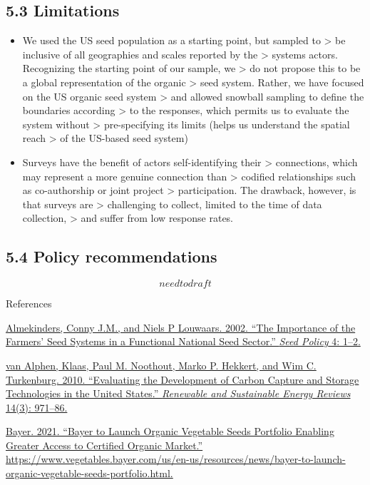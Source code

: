 \documentclass[twoside,12pt,final]{ucthesis-CA2012}
\begin{document}
\begin{ucmainmatter}
{\subsection{5.3 Limitations}\label{limitations}}
\begin{itemize}
\item
  We used the US seed population as a starting point, but sampled to
  \textgreater{} be inclusive of all geographies and scales reported by the
  \textgreater{} system\textquotesingle s actors. Recognizing the starting point of our sample, we
  \textgreater{} do not propose this to be a global representation of the organic
  \textgreater{} seed system. Rather, we have focused on the US organic seed system
  \textgreater{} and allowed snowball sampling to define the boundaries according
  \textgreater{} to the responses, which permits us to evaluate the system without
  \textgreater{} pre-specifying its limits (helps us understand the spatial reach
  \textgreater{} of the US-based seed system)
\item
  Surveys have the benefit of actors self-identifying their
  \textgreater{} connections, which may represent a more genuine connection than
  \textgreater{} codified relationships such as co-authorship or joint project
  \textgreater{} participation. The drawback, however, is that surveys are
  \textgreater{} challenging to collect, limited to the time of data collection,
  \textgreater{} and suffer from low response rates.
\end{itemize}
\hypertarget{policy-recommendations}{%
\subsection{5.4 Policy recommendations}\label{policy-recommendations}}

\[need to draft\]

References

\href{https://www.zotero.org/google-docs/?hv36Bh}{Almekinders, Conny J.M., and Niels P Louwaars. 2002. ``The Importance of
the Farmers' Seed Systems in a Functional National Seed Sector.'' \emph{Seed
Policy} 4: 1--2.}

\href{https://www.zotero.org/google-docs/?hv36Bh}{van Alphen, Klaas, Paul M. Noothout, Marko P. Hekkert, and Wim C.
Turkenburg. 2010. ``Evaluating the Development of Carbon Capture and
Storage Technologies in the United States.'' \emph{Renewable and Sustainable
Energy Reviews} 14(3):
971--86.}

\href{https://www.zotero.org/google-docs/?hv36Bh}{Bayer. 2021. ``Bayer to Launch Organic Vegetable Seeds Portfolio
Enabling Greater Access to Certified Organic Market.''
https://www.vegetables.bayer.com/us/en-us/resources/news/bayer-to-launch-organic-vegetable-seeds-portfolio.html.}


\end{ucmainmatter}
\end{document}
